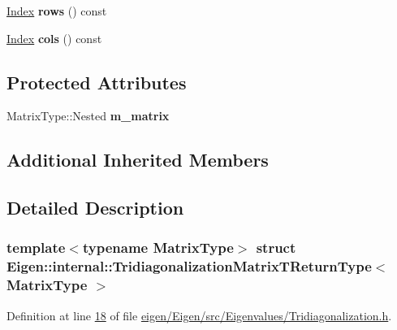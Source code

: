 \begin{DoxyCompactItemize}
\item 
\mbox{\label{struct_eigen_1_1internal_1_1_tridiagonalization_matrix_t_return_type_a273acab55c1ce70ad833d123ac65bbe1}} 
\hyperlink{namespace_eigen_a62e77e0933482dafde8fe197d9a2cfde}{Index} {\bfseries rows} () const
\item 
\mbox{\label{struct_eigen_1_1internal_1_1_tridiagonalization_matrix_t_return_type_aae70afbdf370aa7c9b66fba3da799b06}} 
\hyperlink{namespace_eigen_a62e77e0933482dafde8fe197d9a2cfde}{Index} {\bfseries cols} () const
\end{DoxyCompactItemize}
\subsection*{Protected Attributes}
\begin{DoxyCompactItemize}
\item 
\mbox{\label{struct_eigen_1_1internal_1_1_tridiagonalization_matrix_t_return_type_a140f6293673b4f377337cbbacb32b881}} 
Matrix\+Type\+::\+Nested {\bfseries m\+\_\+matrix}
\end{DoxyCompactItemize}
\subsection*{Additional Inherited Members}


\subsection{Detailed Description}
\subsubsection*{template$<$typename Matrix\+Type$>$\newline
struct Eigen\+::internal\+::\+Tridiagonalization\+Matrix\+T\+Return\+Type$<$ Matrix\+Type $>$}



Definition at line \hyperlink{eigen_2_eigen_2src_2_eigenvalues_2_tridiagonalization_8h_source_l00018}{18} of file \hyperlink{eigen_2_eigen_2src_2_eigenvalues_2_tridiagonalization_8h_source}{eigen/\+Eigen/src/\+Eigenvalues/\+Tridiagonalization.\+h}.



